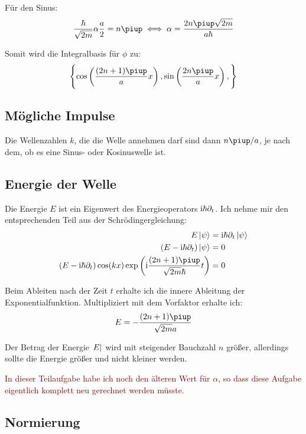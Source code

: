Für den Sinus:
\[
	\frac\hbar{\sqrt{2m}}\alpha \frac a2 = n\piup
	\iff
	\alpha = \frac{2n\piup \sqrt{2m}}{a\hbar}
\]

Somit wird die Integralbasis für $\phi$ zu:
\[
	\set{
		\cos\del{\frac{(2n+1)\piup}{a} x},
		\sin\del{\frac{2n\piup}{a} x},
	}
\]

\subsection{Mögliche Impulse}

Die Wellenzahlen $k$, die die Welle annehmen darf sind dann $n\piup/a$, je nach dem, ob es eine Sinus- oder Kosinuswelle ist.

\subsection{Energie der Welle}

Die Energie $E$ ist ein Eigenwert des Energieoperators $\mathrm i \hbar \partial_t$. Ich nehme mir den entsprechenden Teil aus der Schrödingergleichung:
\begin{align*}
	E \ket\psi &= \iup \hbar \partial_t \ket\psi \\
	\del{E - \ii \hbar \partial_t} \ket\psi &= 0 \\
	\del{E - \ii \hbar \partial_t} \cos(kx) \exp\del{\ii \frac{(2n+1)\piup}{\sqrt{2m}\hbar} t} &= 0
\end{align*}

Beim Ableiten nach der Zeit $t$ erhalte ich die innere Ableitung der Exponentialfunktion. Multipliziert mit dem Vorfaktor erhalte ich:
\[
	E = - \frac{(2n+1)\piup}{\sqrt{2m}a}
\]

Der Betrag der Energie $\abs E$ wird mit steigender Bauchzahl $n$ größer, allerdings sollte die Energie größer und nicht kleiner werden.

\textcolor{darkred}{%
	In dieser Teilaufgabe habe ich noch den älteren Wert für $\alpha$, so dass
	diese Aufgabe eigentlich komplett neu gerechnet werden müsste.
}

\subsection{Normierung}

\fehlt


\IfFileExists{\bibliographyfile}{
	
	
}{}



